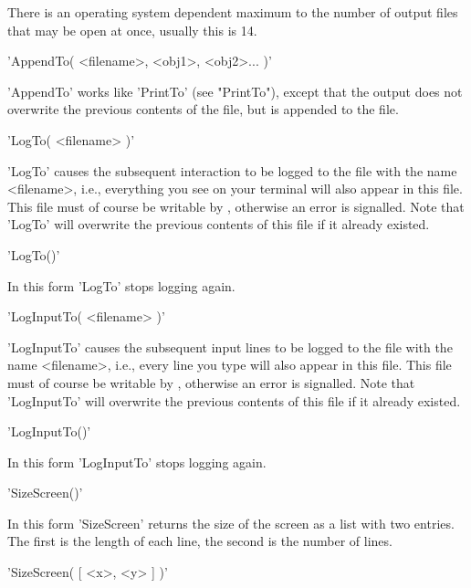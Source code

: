 There is an  operating  system dependent maximum to the number  of output
files that may be open at once, usually this is 14.

%
%

'AppendTo( <filename>, <obj1>, <obj2>... )'

'AppendTo' works like  'PrintTo'  (see "PrintTo"), except that the output
does not overwrite the previous contents of the  file, but is appended to
the file.

%
%

'LogTo( <filename> )'

'LogTo' causes the subsequent interaction  to be logged to the file  with
the name <filename>, i.e., everything you see on your  terminal will also
appear in this  file.   This file must  of course be  writable by {\GAP},
otherwise  an error  is  signalled.  Note that 'LogTo' will overwrite the
previous contents of this file if it already existed.

'LogTo()'

In this form 'LogTo' stops logging again.

%
%

'LogInputTo( <filename> )'

'LogInputTo' causes  the subsequent input lines to be logged to the  file
with the name <filename>, i.e., every line  you type will also appear  in
this file.  This file must  of course be writable by {\GAP}, otherwise an
error is signalled.  Note that 'LogInputTo'  will  overwrite the previous
contents of this file if it already existed.

'LogInputTo()'

In this form 'LogInputTo' stops logging again.

%

'SizeScreen()'

In this form 'SizeScreen' returns the size of the screen as  a list  with
two entries.  The first is the length of each line,  the  second  is  the
number of lines.

'SizeScreen( [ <x>, <y> ] )'

